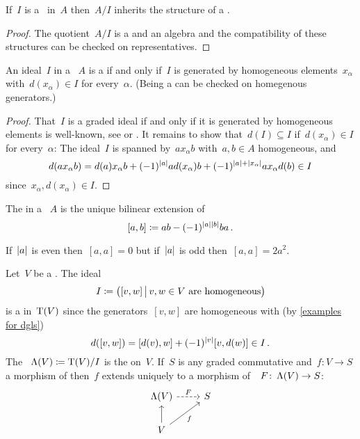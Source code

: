 \documentclass[a4paper,10pt,headings=standardclasses]{scrartcl}
\begin{document}
\begin{lemma}
  \label{quotient of dga}
  If~$I$ is a~{\dgi} in~$A$ then~$A/I$ inherits the structure of a {\dga}.
\end{lemma}

\begin{proof}
  The quotient~$A/I$ is a {\dgv} and an algebra and the compatibility of these structures can be checked on representatives.
\end{proof}

\begin{lemma}
  An ideal~$I$ in a {\dga}~$A$ is a {\dgi} if and only if~$I$ is generated by homogeneous elements~$x_\alpha$ with~$d(x_\alpha) \in I$ for every~$\alpha$.
  (Being a {\dgi} can be checked on homegenous generators.)
\end{lemma}

\begin{proof}
  That~$I$ is a graded ideal if and only if it is generated by homogeneous elements is  well-known, see \cite[IX, 2.5]{lang} or \cite[II.{\S}11.3]{bourbaki}.
  It remains to show that~$d(I) \subseteq I$ if~$d(x_\alpha) \in I$ for every~$\alpha$:
  The ideal~$I$ is spanned by~$a x_\alpha b$ with~$a, b \in A$ homogeneous, and
  \[
    d(a x_\alpha b)
    =
      d(a) x_\alpha b
    + (-1)^{\lvert a\rvert} a d(x_\alpha) b
    + (-1)^{\lvert a\rvert + \lvert x_\alpha\rvert} a x_\alpha d(b)
    \in
    I
  \]
  since~$x_\alpha, d(x_\alpha) \in I$.
\end{proof}

\begin{definition}
  The  in a {\dga}~$A$ is the unique bilinear extension of
  \[
    [a,b]
    \coloneqq
    ab - (-1)^{\lvert a\rvert\lvert b\rvert} ba \,.
  \]
\end{definition}

\begin{warning}
  \label{warning self-commutator for dga}
  If~$\lvert a\rvert$ is even then~$[a,a] = 0$ but if~$\lvert a\rvert$ is odd then~$[a,a] = 2 a^2$.
\end{warning}

\begin{example}
  \label{dg symmetric algebra}
  Let~$V$ be a {\dgv}.
  The ideal
  \[
    I
    \defined
    \bigl(
      [v,w]
    \suchthat[\big]
      \text{$v,w \in V$ are homogeneous}
    \bigr)
  \]
  is a {\dgi} in~$\operatorname{T}(V)$ since the generators~$[v,w]$ are homogeneous with (by \cref{examples for dgls})
  \[
    d([v,w])
    =
    [d(v), w] + (-1)^{\lvert v\rvert} [v, d(w)]
    \in
    I \,.
  \]
  The {\dga}~$\operatorname{\Lambda}(V) \coloneqq \operatorname{T}(V)/I$ is the  on~$V$.
  If~$S$ is any graded commutative {\dga} and~$f \colon V \to S$ a morphism of {\dgvs} then~$f$ extends uniquely to a morphism of~{\dgas}~$F \colon \operatorname{\Lambda}(V) \to S$:
  \[
    \begin{tikzcd}
      \dgSymm(V)
      \arrow[dashed]{r}[above]{F}
      &
      S
      \\
      V
      \arrow{u}
      \arrow{ur}[below right]{f}
      &
      {}
    \end{tikzcd}
  \]

\end{example}
\end{document}
